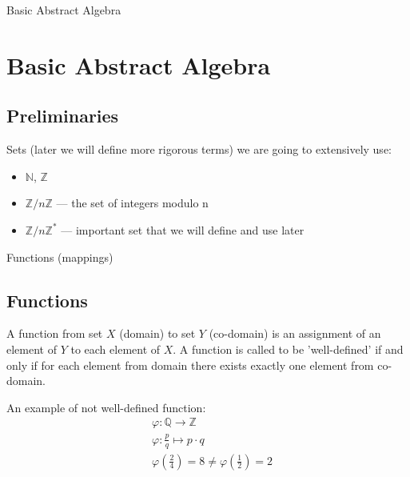 \documentclass{beamer}
\begin{document}
\begin{frame}{Basic Abstract Algebra}
    \section{Basic Abstract Algebra}
    \subsection{Preliminaries}
    Sets (later we will define more rigorous terms) we are going to extensively 
        use:
    \begin{itemize}
        \item $\mathbb{N}$, $\mathbb{Z}$
        \item $\mathbb{Z} / n\mathbb{Z}$ --- the set of integers modulo n
        \item $\mathbb{Z} / n \mathbb{Z}^{*}$ --- important set that we will 
            define and use later
    \end{itemize} 
\end{frame}

\begin{frame}{Functions (mappings)}
    \subsection{Functions}
    \begin{definition}
        A function from set $X$ (domain) to set $Y$ (co-domain) is an assignment 
            of an element of $Y$ to each element of $X$. A function is called to 
            be 'well-defined' if and only if for each element from domain there 
            exists exactly one element from co-domain.  
    \end{definition}
    \begin{example}
        An example of not well-defined function: \\
        \begin{align*}
            & \varphi : \mathbb{Q} \to \mathbb{Z} \\
            & \varphi : \frac{p}{q} \mapsto p \cdot q \\
            & \varphi\left(\frac{2}{4}\right) = 8 \ne \varphi\left(\frac{1}{2}\right) = 2
        \end{align*}
    \end{example}
\end{frame}
\end{document}
